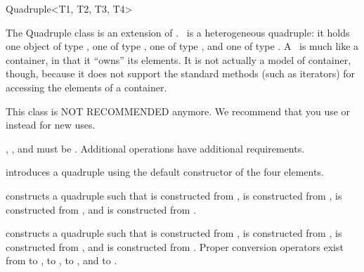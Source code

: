 \begin{ccRefClass}{Quadruple<T1, T2, T3, T4>}
  
  \ccDefinition The Quadruple class is an extension of
  .  \ccRefName\ is a heterogeneous quadruple: it holds
  one object of type , one of type , one of type
  , and one of type .  A \ccRefName\ is much like a
  container, in that it ``owns'' its elements. It is not actually a
  model of container, though, because it does not support the standard
  methods (such as iterators) for accessing the elements of a
  container.

  This class is NOT RECOMMENDED anymore.  We recommend that you use
   or  instead for new uses.

  
  \ccRequirements {}, ,  and  must be
  . Additional operations have additional requirements.


  \ccTypes
  \ccGlue
  \ccGlue
  \ccGlue

  \ccGlue
  \ccGlue
  \ccGlue

  \ccCreation
  
   {introduces a quadruple using the
    default constructor of the four elements.}
  
   {constructs a
    quadruple such that  is constructed from ,
     is constructed from ,  is
    constructed from , and  is constructed from
    .}
  
   {constructs a quadruple such that
     is constructed from ,  is
    constructed from ,  is constructed from ,
    and  is constructed from . \ccRequire Proper
    conversion operators exist from  to ,  to
    ,  to , and  to .  }


\end{ccRefClass}
